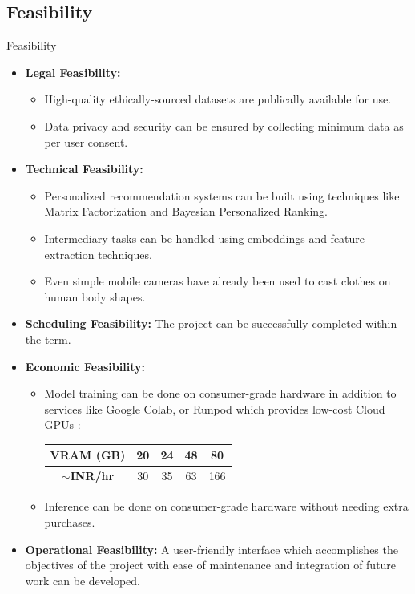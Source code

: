 \subsection{Feasibility}
\begin{frame}[allowframebreaks]{Feasibility}
	\begin{itemize}
		\item \textbf{Legal Feasibility:}
			\begin{itemize}
				\item High-quality ethically-sourced datasets are publically available for use.
				\item Data privacy and security can be ensured by collecting minimum data as per user consent.
			\end{itemize}
		\item \textbf{Technical Feasibility:}
			\begin{itemize}
				\item Personalized recommendation systems can be built using techniques like Matrix Factorization and Bayesian Personalized Ranking.
				\item Intermediary tasks can be handled using embeddings and feature extraction techniques.
				\item Even simple mobile cameras have already been used to cast clothes on human body shapes.
			\end{itemize}
		\item \textbf{Scheduling Feasibility:} The project can be successfully completed within the term.
		
		\pagebreak

		\item \textbf{Economic Feasibility:}
			\begin{itemize}
				\item Model training can be done on consumer-grade hardware in addition to services like Google Colab, or Runpod which provides low-cost Cloud GPUs \cite{runpodInstancePricing}:
				\begin{table}
					\vspace*{0.25cm}
					\centering
					\begin{tabular}{c|c|c|c|c}
						\textbf{VRAM (GB)} & 20 & 24 & 48 & 80 \\
						\hline
						\textbf{$\sim$INR/hr} & 30 & 35 & 63 & 166 \\
					\end{tabular}
					\vspace*{0.25cm}
				\end{table}
				\item Inference can be done on consumer-grade hardware without needing extra purchases.
			\end{itemize}

		\item \textbf{Operational Feasibility:} A user-friendly interface which accomplishes the objectives of the project with ease of maintenance and integration of future work can be developed.
	\end{itemize}
\end{frame}

